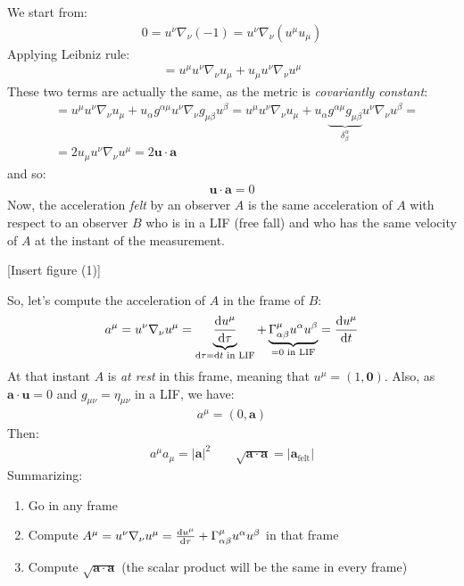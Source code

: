 \documentclass[../template.tex]{subfiles}
\begin{document}
We start from:
\begin{align*}
    0 = u^\nu \nabla_\nu (-1) = u^\nu \nabla_\nu (u^\mu u_\mu)
\end{align*}
Applying Leibniz rule:
\begin{align*}
    = u^\mu u^\nu \nabla_\nu u_\mu + u_\mu u^\nu \nabla_\nu u^\mu
\end{align*}
These two terms are actually the same, as the metric is \textit{covariantly constant}:
\begin{align*}
    &= u^\mu u^\nu \nabla_\nu u_\mu+ u_\alpha g^{\alpha \mu} u^\nu \nabla_\nu g_{\mu \beta}u^\beta = u^\mu u^\nu \nabla_\nu u_\mu + u_\alpha \underbrace{g^{\alpha \mu} g_{\mu \beta}}_{\delta^\alpha_\beta}  u^\nu \nabla_\nu u^\beta = \\
    &= 2 u_\mu u^\nu \nabla_\nu u^\mu = 2 \bm{u}\cdot \bm{a}
\end{align*} 
and so:
\begin{align*}
    \bm{u}\cdot \bm{a} = 0
\end{align*}
Now, the acceleration \textit{felt} by an observer $A$ is the same acceleration of $A$ with respect to an observer $B$ who is in a LIF (free fall) and who has the same velocity of $A$ at the instant of the measurement.

[Insert figure (1)]

So, let's compute the acceleration of $A$ in the frame of $B$: 
\begin{align*}
    a^\mu = u^\nu \nabla_\nu u^\mu = \underbrace{\dv{u^\mu}{\tau}}_{\dd{\tau} = \dd{t} \text{ in LIF}} + \underbrace{\Gamma_{\alpha \beta}^\mu u^\alpha u^\beta}_{=0 \text{ in LIF}} = \dv{u^\mu}{t}
\end{align*}
At that instant $A$ is \textit{at rest} in this frame, meaning that $u^\mu = (1,\bm{0})$. Also, as $\bm{a} \cdot \bm{u} = 0$ and $g_{\mu \nu} = \eta_{\mu \nu}$ in a LIF, we have:
\begin{align*}
    a^\mu = (0, \bm{a})
\end{align*}    
Then:
\begin{align*}
    a^\mu a_\mu = |\bm{a}|^2 \qquad \sqrt{\bm{a} \cdot \bm{a}} = |\bm{a}_{\mathrm{felt} }|
\end{align*}
Summarizing:
\begin{enumerate}
    \item Go in any frame
    \item Compute $A^\mu = u^\nu \nabla_\nu u^\mu = \dv{u^\mu}{\tau} + \Gamma^\mu_{\alpha \beta} u^\alpha u^\beta$ in that frame
    \item Compute $\sqrt{\bm{a} \cdot \bm{a}}$ (the scalar product will be the same in every frame)
\end{enumerate}
\end{document}
